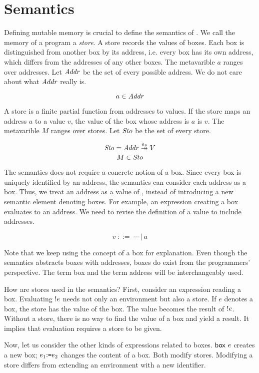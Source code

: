 \section{Semantics}

Defining mutable memory is crucial to define the semantics of \lang.
We call the memory of a program a \textit{store}. A store records the values of boxes.
Each box is distinguished from another box by its address, i.e. every box has
its own address, which differs from the addresses of any other boxes.
The metavarible $a$ ranges over addresses. Let $\mbox{\emph{Addr}}$ be the set of every
possible address. We do not care about what $\mbox{\emph{Addr}}$ really is.

\[ a \in \mbox{\emph{Addr}} \]

A store is a finite partial function from addresses to values.
If the store maps an address $a$ to a value $v$, the value of the box whose
address is $a$ is $v$. The metavarible $M$ ranges over stores. Let $\mbox{\emph{Sto}}$
be the set of every store.

\[ \embox{Sto} = \embox{Addr}\finto V \]
\[ M \in \mbox{\emph{Sto}} \]

The semantics does not require a concrete notion of a box. Since every
box is uniquely identified by an address, the semantics can consider each
address as a box. Thus, we treat an address as a value of \lang, instead of
introducing a new semantic element denoting boxes. For example, an expression
creating a box evaluates to an address. We need to revise the definition of a
value to include addresses.

\[ v\ ::=\ \cdots\ |\ a \]

Note that we keep using the concept of a box for explanation.
Even though the semantics abstracts boxes with addresses,
boxes do exist from the programmers' perspective.
The term box and the term address will be interchangeably used.

How are stores used in the semantics? First, consider an expression reading a
box. Evaluating \(!e\) needs not only an environment but also a store.
If $e$ denotes a box, the store has the value of the box. The value becomes
the result of \(!e\). Without a store, there is no way to find the value
of a box and yield a result. It implies that evaluation requires a store to be
given.

Now, let us consider the other kinds of expressions related to boxes.
$\textsf{box}\ e$ creates a new box; $e_1{:}\texttt{=} e_2$ changes
the content of a box. Both modify stores. Modifying a store differs from
extending an environment with a new identifier.

